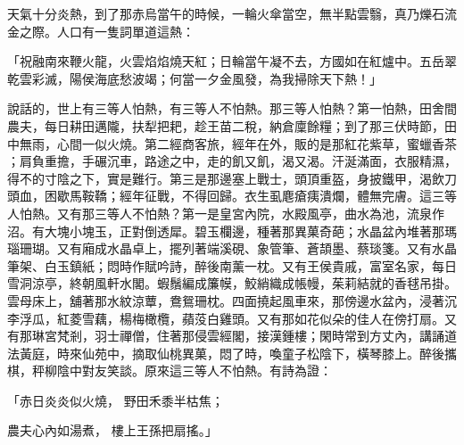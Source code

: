 天氣十分炎熱，到了那赤烏當午的時候，一輪火傘當空，無半點雲翳，真乃爍石流金之際。人口有一隻詞單道這熱：

「祝融南來鞭火龍，火雲焰焰燒天紅；日輪當午凝不去，方國如在紅爐中。五岳翠乾雲彩滅，陽侯海底愁波竭；何當一夕金風發，為我掃除天下熱！」

說話的，世上有三等人怕熱，有三等人不怕熱。那三等人怕熱？第一怕熱，田舍間農夫，每日耕田邁隴，扶犁把耙，趁王苗二稅，納倉廩餘糧；到了那三伏時節，田中無雨，心間一似火燒。第二經商客旅，經年在外，販的是那紅花紫草，蜜蠟香茶 ；肩負重擔，手碾沉車，路途之中，走的飢又飢，渴又渴。汗涎滿面，衣服精濕，得不的寸陰之下，實是難行。第三是那邊塞上戰士，頭頂重盔，身披鐵甲，渴飲刀頭血，困歇馬鞍鞽；經年征戰，不得回歸。衣生虱麀瘡痍潰爛，體無完膚。這三等人怕熱。又有那三等人不怕熱？第一是皇宮內院，水殿風亭，曲水為池，流泉作沼。有大塊小塊玉，正對倒透犀。碧玉欄邊，種著那異菓奇葩；水晶盆內堆著那瑪瑙珊瑚。又有廂成水晶卓上，擺列著端溪硯、象管筆、蒼頡墨、蔡琰箋。又有水晶筆架、白玉鎮紙；悶時作賦吟詩，醉後南薰一枕。又有王侯貴戚，富室名家，每日雪洞涼亭，終朝風軒水閣。蝦鬚編成簾幙，鮫綃織成帳幔，茱莉結就的香毬吊掛。雲母床上，舖著那水紋涼蕈，鴦鴛珊枕。四面撓起風車來，那傍邊水盆內，浸著沉李浮瓜，紅菱雪藕，楊梅橄欖，蘋莈白雞頭。又有那如花似朵的佳人在傍打扇。又有那琳宮梵剎，羽士禪僧，住著那侵雲經閣，接漢鍾樓；閑時常到方丈內，講誦道法黃庭，時來仙苑中，摘取仙桃異菓，悶了時，喚童子松陰下，橫琴膝上。醉後攜棋，秤柳陰中對友笑談。原來這三等人不怕熱。有詩為證：

「赤日炎炎似火燒，  野田禾黍半枯焦；

農夫心內如湯煮，  樓上王孫把扇搖。」


